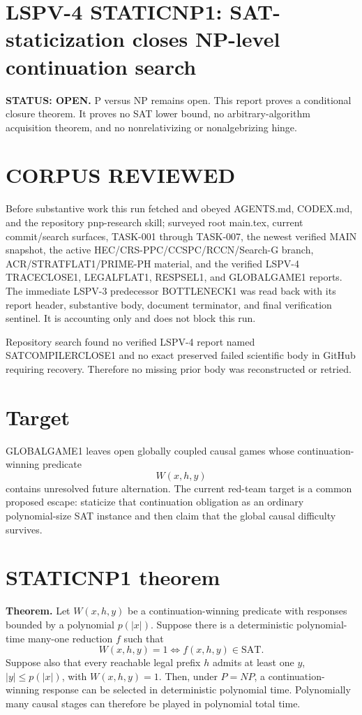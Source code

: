 \documentclass[11pt]{article}
\begin{document}
\section*{LSPV-4 STATICNP1: SAT-staticization closes NP-level continuation search}
\textbf{STATUS: OPEN.} P versus NP remains open. This report proves a conditional closure theorem. It proves no SAT lower bound, no arbitrary-algorithm acquisition theorem, and no nonrelativizing or nonalgebrizing hinge.

\section*{CORPUS REVIEWED}
Before substantive work this run fetched and obeyed AGENTS.md, CODEX.md, and the repository pnp-research skill; surveyed root main.tex, current commit/search surfaces, TASK-001 through TASK-007, the newest verified MAIN snapshot, the active HEC/CRS-PPC/CCSPC/RCCN/Search-G branch, ACR/STRATFLAT1/PRIME-PH material, and the verified LSPV-4 TRACECLOSE1, LEGALFLAT1, RESPSEL1, and GLOBALGAME1 reports. The immediate LSPV-3 predecessor BOTTLENECK1 was read back with its report header, substantive body, document terminator, and final verification sentinel. It is accounting only and does not block this run.

Repository search found no verified LSPV-4 report named SATCOMPILERCLOSE1 and no exact preserved failed scientific body in GitHub requiring recovery. Therefore no missing prior body was reconstructed or retried.

\section*{Target}
GLOBALGAME1 leaves open globally coupled causal games whose continuation-winning predicate
\[
W(x,h,y)
\]
contains unresolved future alternation. The current red-team target is a common proposed escape: staticize that continuation obligation as an ordinary polynomial-size SAT instance and then claim that the global causal difficulty survives.

\section*{STATICNP1 theorem}
\textbf{Theorem.} Let \(W(x,h,y)\) be a continuation-winning predicate with responses bounded by a polynomial \(p(|x|)\). Suppose there is a deterministic polynomial-time many-one reduction \(f\) such that
\[
W(x,h,y)=1\iff f(x,h,y)\in\mathrm{SAT}.
\]
Suppose also that every reachable legal prefix \(h\) admits at least one \(y\), \(|y|\le p(|x|)\), with \(W(x,h,y)=1\). Then, under \(P=NP\), a continuation-winning response can be selected in deterministic polynomial time. Polynomially many causal stages can therefore be played in polynomial total time.
\end{document}
